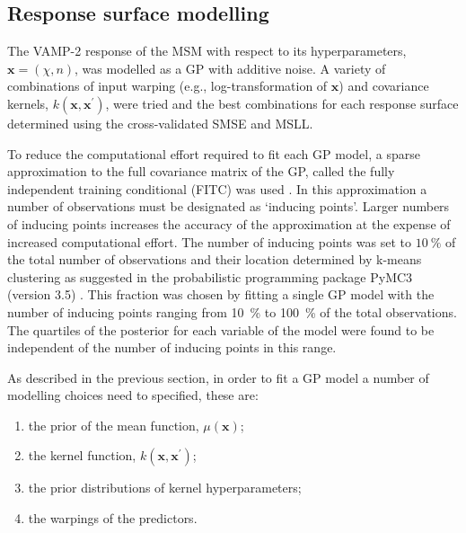 \subsection{Response surface modelling}\label{subsec:rsm}
The VAMP-2 response of the MSM with respect to its hyperparameters, $\mathbf{x} = (\chi, n)$, was modelled as a GP with additive noise. A variety of combinations of input warping (e.g., log-transformation of $\mathbf{x}$) and covariance kernels, $k(\mathbf{x}, \mathbf{x}^{\prime})$,  were tried and the best combinations for each response surface determined using the cross-validated SMSE and MSLL. 

To reduce the computational effort required to fit each GP model, a sparse approximation to the full covariance matrix of the GP, called the fully independent training conditional (FITC) was used \cite{quinonero-candelaUnifyingViewSparse2005}. In this approximation a number of observations must be designated as `inducing points'. Larger numbers of inducing points increases the accuracy of the approximation at the expense of increased computational effort. The number of inducing points was set to $\SI{10}{\percent}$ of the total number of observations and their location determined by k-means clustering as suggested in the probabilistic programming package PyMC3 (version 3.5) \cite{salvatierProbabilisticProgrammingPython2016}. This fraction was chosen by fitting a single GP model with the number of inducing points ranging from \SI{10}{\percent} to \SI{100}{\percent} of the total observations. The quartiles of the posterior for each variable of the model were found to be independent of the number of inducing points in this range.  

As described in the previous section, in order to fit a GP model a number of modelling choices need to specified, these are: 
\begin{enumerate}
    \item the prior of the mean function, $\mu(\mathbf{x})$;
    \item the kernel function, $k(\mathbf{x}, \mathbf{x}^{\prime})$;
    \item the prior distributions of kernel hyperparameters;
    \item the warpings of the predictors.
\end{enumerate}

